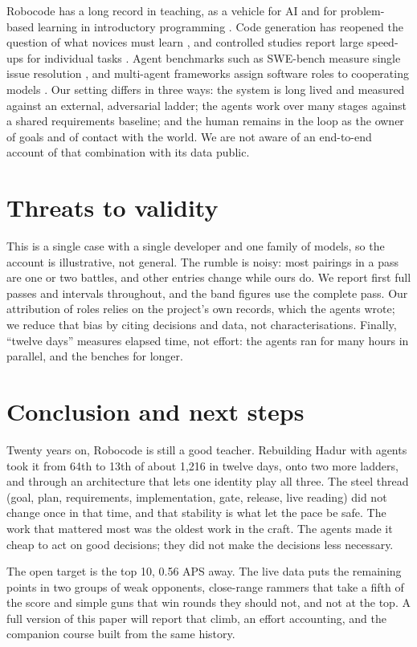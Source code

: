 \documentclass[10pt,twocolumn]{article}
\begin{document}
Robocode has a long record in teaching, as a vehicle for AI \cite{hartness2004} and for
problem-based learning in introductory programming \cite{okelly2006}. Code generation has reopened
the question of what novices must learn \cite{becker2023}, and controlled studies report large
speed-ups for individual tasks \cite{peng2023}. Agent benchmarks such as SWE-bench measure single
issue resolution \cite{jimenez2024,yang2024}, and multi-agent frameworks assign software roles to
cooperating models \cite{hong2024,qian2024}. Our setting differs in three ways: the system is long
lived and measured against an external, adversarial ladder; the agents work over many stages
against a shared requirements baseline; and the human remains in the loop as the owner of goals
and of contact with the world. We are not aware of an end-to-end account of that combination
with its data public.

\section{Threats to validity}

This is a single case with a single developer and one family of models, so the account is
illustrative, not general. The rumble is noisy: most pairings in a pass are one or two battles,
and other entries change while ours do. We report first full passes and intervals throughout, and
the band figures use the complete pass. Our attribution of roles relies on the project's own
records, which the agents wrote; we reduce that bias by citing decisions and data, not
characterisations. Finally, ``twelve days'' measures elapsed time, not effort: the agents ran for
many hours in parallel, and the benches for longer.

\section{Conclusion and next steps}

Twenty years on, Robocode is still a good teacher. Rebuilding Hadur with agents took it from 64th
to 13th of about 1,216 in twelve days, onto two more ladders, and through an architecture that
lets one identity play all three. The steel thread (goal, plan, requirements, implementation,
gate, release, live reading) did not change once in that time, and that stability is what let the
pace be safe. The work that mattered most was the oldest work in the craft. The agents made it
cheap to act on good decisions; they did not make the decisions less necessary.

The open target is the top 10, 0.56 APS away. The live data puts the remaining points in two groups
of weak opponents, close-range rammers that take a fifth of the score and simple guns that win
rounds they should not, and not at the top. A full version of this paper will report that climb,
an effort accounting, and the companion course built from the same history.



\end{document}
